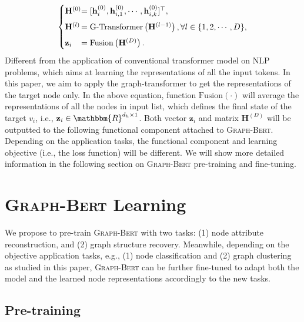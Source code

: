 \documentclass{article}
\newcommand{\mb}{\mathbf}
\newcommand{\our}{\textsc{Graph-Bert}}
\begin{document}
\begin{equation}
\begin{cases}
\vspace{5pt}
\mb{H}^{(0)} & \hspace{-10pt} = [\mb{h}_i^{(0)}, \mb{h}_{i,1}^{(0)}, \cdots, \mb{h}_{i,k}^{(0)}]^\top ,\\
\vspace{5pt}
\mb{H}^{(l)} &\hspace{-10pt}= \mbox{G-Transformer} \left( \mb{H}^{(l-1)}\right), \forall l \in \{1, 2, \cdots, D\},\\
\mb{z}_i &\hspace{-10pt}= \mbox{Fusion} \left( \mb{H}^{(D)} \right). 
\end{cases}
\end{equation}
Different from the application of conventional transformer model on NLP problems, which aims at learning the representations of all the input tokens. In this paper, we aim to apply the graph-transformer to get the representations of the target node only. In the above equation, function $\mbox{Fusion} \left(\cdot\right)$ will average the representations of all the nodes in input list, which defines the final state of the target $v_i$, i.e., $\mb{z}_i \in \mathbbm{R}^{d_h \times 1}$. Both vector $\mb{z}_i$ and matrix $\mb{H}^{(D)}$ will be outputted to the following functional component attached to {\our}. Depending on the application tasks, the functional component and learning objective (i.e., the loss function) will be different. We will show more detailed information in the following section on {\our} pre-training and fine-tuning.



\section{{\our} Learning}\label{sec:analysis}

We propose to pre-train {\our} with two tasks: (1) node attribute reconstruction, and (2) graph structure recovery. Meanwhile, depending on the objective application tasks, e.g., (1) node classification and (2) graph clustering as studied in this paper, {\our} can be further fine-tuned to adapt both the model and the learned node representations accordingly to the new tasks.

\subsection{Pre-training}
\end{document}

